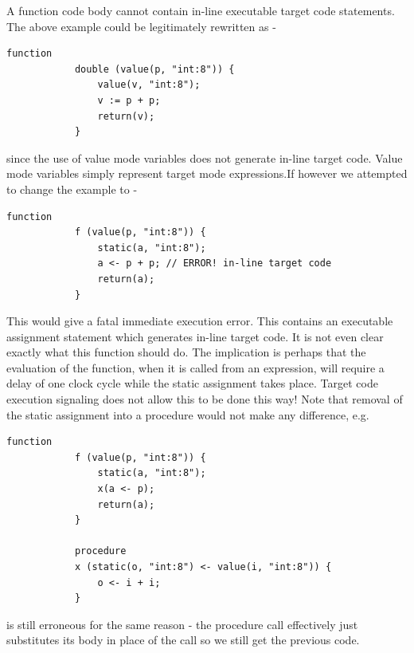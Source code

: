         A function code body cannot contain in-line executable target code
        statements. The above example could be legitimately rewritten as -
        
        \begin{lstlisting}[gobble=8, language=threepl]
            function
            double (value(p, "int:8")) {
                value(v, "int:8");
                v := p + p;
                return(v);
            }
        \end{lstlisting}
        
        since the use of value mode variables does not generate in-line target
        code. Value mode variables simply represent target mode expressions.If
        however we attempted to change the example to -
        
        \begin{lstlisting}[gobble=8, language=threepl]
            function
            f (value(p, "int:8")) {
                static(a, "int:8");
                a <- p + p; // ERROR! in-line target code
                return(a);
            }
        \end{lstlisting}
        
        This would give a fatal immediate execution error. This contains an
        executable assignment statement which generates in-line target code.
        It is not even clear exactly what this function should do. The
        implication is perhaps that the evaluation of the function, when it
        is called from an expression, will require a delay of one clock cycle
        while the static assignment takes place. Target code execution
        signaling does not allow this to be done this way! Note that removal
        of the static assignment into a procedure would not make any
        difference, e.g.
        \begin{lstlisting}[gobble=8, language=threepl]
            function
            f (value(p, "int:8")) {
                static(a, "int:8");
                x(a <- p);
                return(a);
            }

            procedure
            x (static(o, "int:8") <- value(i, "int:8")) {
                o <- i + i;
            }
        \end{lstlisting}
        
        is still erroneous for the same reason - the procedure call
        effectively just substitutes its body in place of the call so we
        still get the previous code.

